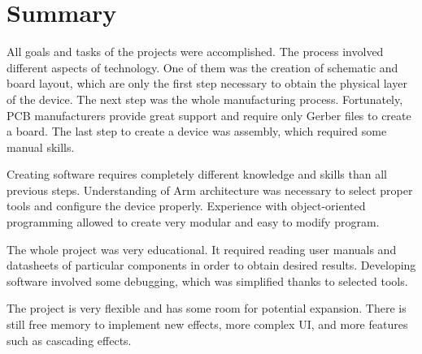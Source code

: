 \documentclass[a4paper,twoside,12pt]{book}
\newcounter{PagesWithoutNumbers}
\begin{document}
\chapter{Summary}\label{ch:summary}
All goals and tasks of the projects were accomplished.
The process involved different aspects of technology.
One of them was the creation of schematic and board layout,
which are only the first step necessary to obtain 
the physical layer of the device.
The next step was the whole manufacturing process.
Fortunately, PCB manufacturers provide great support
and require only Gerber files to create a board.
The last step to create a device was assembly,
which required some manual skills.

Creating software requires completely different
knowledge and skills than all previous steps.
Understanding of Arm architecture was necessary
to select proper tools and configure the device properly.
Experience with object-oriented programming
allowed to create very modular and easy to modify program.

The whole project was very educational.
It required reading user manuals and datasheets of particular components
in order to obtain desired results.
Developing software involved some debugging,
which was simplified thanks to selected tools.

The project is very flexible and has some room for potential expansion.
There is still free memory to implement new effects, more complex UI,
and more features such as cascading effects.

\backmatter
{}
\setcounter{page}{\value{PagesWithoutNumbers}}

\pagestyle{onlyPageNumbers}

\printbibliography



\end{document}
